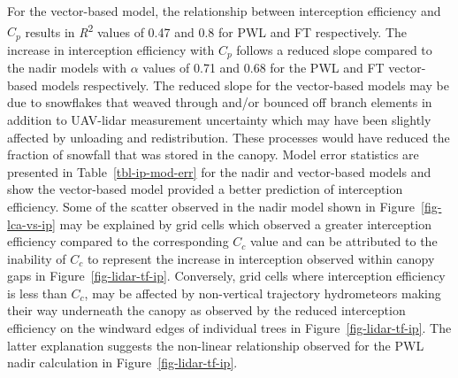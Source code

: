 \documentclass[
  letterpaper,
  DIV=11,
  numbers=noendperiod]{scrartcl}
\begin{document}
For the vector-based model, the relationship between interception
efficiency and \(C_p\) results in \emph{R}\textsuperscript{2} values of
0.47 and 0.8 for PWL and FT respectively. The increase in interception
efficiency with \(C_p\) follows a reduced slope compared to the nadir
models with \(\alpha\) values of 0.71 and 0.68 for the PWL and FT
vector-based models respectively. The reduced slope for the vector-based
models may be due to snowflakes that weaved through and/or bounced off
branch elements in addition to UAV-lidar measurement uncertainty which
may have been slightly affected by unloading and redistribution. These
processes would have reduced the fraction of snowfall that was stored in
the canopy. Model error statistics are presented in
Table~\ref{tbl-ip-mod-err} for the nadir and vector-based models and
show the vector-based model provided a better prediction of interception
efficiency. Some of the scatter observed in the nadir model shown in
Figure~\ref{fig-lca-vs-ip} may be explained by grid cells which observed
a greater interception efficiency compared to the corresponding \(C_c\)
value and can be attributed to the inability of \(C_c\) to represent the
increase in interception observed within canopy gaps in
Figure~\ref{fig-lidar-tf-ip}. Conversely, grid cells where interception
efficiency is less than \(C_c\), may be affected by non-vertical
trajectory hydrometeors making their way underneath the canopy as
observed by the reduced interception efficiency on the windward edges of
individual trees in Figure~\ref{fig-lidar-tf-ip}. The latter explanation
suggests the non-linear relationship observed for the PWL nadir
calculation in Figure~\ref{fig-lidar-tf-ip}.

\pagebreak
\end{document}
